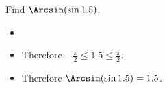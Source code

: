\begin{frame}
\begin{example}
Find $\Arcsin (\sin 1.5)$.
\begin{itemize}
\item<2->  
\item<4->  Therefore $-\frac{\pi}{2} \leq 1.5\leq \frac{\pi}{2}$.
\item<5->  Therefore $\Arcsin (\sin 1.5) = 1.5$.
\end{itemize}
\end{example}
\end{frame}
